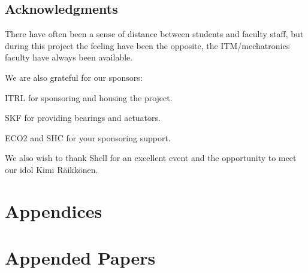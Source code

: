 \documentclass[a4paper, 12pt]{report}
\begin{document}
\clearpage
{}


%









\chapter*{Acknowledgments}
There have often been a sense of distance between students and faculty staff, 
but during this project the feeling have
been the opposite, the ITM/mechatronics faculty have always been available.

\noindent
We are also grateful for our sponsors:

ITRL for sponsoring and housing the project.

SKF for providing bearings and actuators.

ECO2 and SHC for your sponsoring support.

\noindent
We also wish to thank Shell for an excellent event and the opportunity to meet our idol
Kimi Räikkönen. 


\appendix
\part{Appendices}



\part{Appended Papers}


\end{document}
